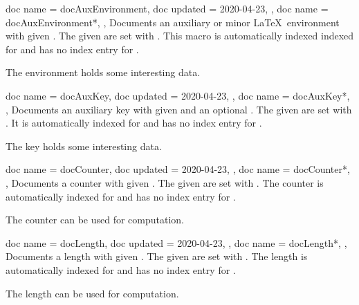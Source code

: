 \begin{docCommands}[doc parameter=\oarg{options}\marg{name}]
  {
    {
      doc name    = docAuxEnvironment,
      doc updated = 2020-04-23,
    },
    {
      doc name = docAuxEnvironment*,
    },
  }
  Documents an auxiliary or minor \LaTeX\ environment with given .
  The given  are set with .
  This macro is automatically indexed indexed for 
  and has no index entry for .
\begin{dispExample}
The environment  holds some interesting data.
\end{dispExample}
\end{docCommands}


\begin{docCommands}[doc parameter=\oarg{key path}\oarg{options}\marg{name}]
  {
    {
      doc name    = docAuxKey,
      doc updated = 2020-04-23,
    },
    {
      doc name = docAuxKey*,
    },
  }
  Documents an auxiliary key with given  and an optional .
  The given  are set with .
  It is automatically indexed for 
  and has no index entry for .
\begin{dispExample}
The key  holds some interesting data.
\end{dispExample}
\end{docCommands}



\begin{docCommands}[doc parameter=\oarg{options}\marg{name}]
  {
    {
      doc name    = docCounter,
      doc updated = 2020-04-23,
    },
    {
      doc name = docCounter*,
    },
  }
  Documents a counter with given .
  The given  are set with .
  The counter is automatically indexed for 
  and has no index entry for .
\begin{dispExample}
The counter  can be used for computation.
\end{dispExample}
\end{docCommands}


\clearpage
\begin{docCommands}[doc parameter=\oarg{options}\marg{name}]
  {
    {
      doc name    = docLength,
      doc updated = 2020-04-23,
    },
    {
      doc name = docLength*,
    },
  }
  Documents a length with given .
  The given  are set with .
  The length is automatically indexed for 
  and has no index entry for .
\begin{dispExample}
The length  can be used for computation.
\end{dispExample}
\end{docCommands}


